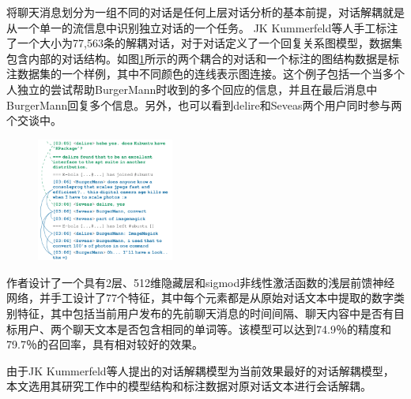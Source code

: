 将聊天消息划分为一组不同的对话是任何上层对话分析的基本前提，对话解耦就是从一个单一的流信息中识别独立对话的一个任务。
JK Kummerfeld等人\cite{kummerfeld2018large}手工标注了一个大小为77,563条的解耦对话，对于对话定义了一个回复关系图模型，数据集包含内部的对话结构。如图\ref{fig:example-conversation}所示的两个耦合的对话和一个标注的图结构数据是标注数据集的一个样例，其中不同颜色的连线表示图连接。这个例子包括一个当多个人独立的尝试帮助BurgerMann时收到的多个回应的信息，并且在最后消息中BurgerMann回复多个信息。另外，也可以看到delire和Seveas两个用户同时参与两个交谈中。
\begin{figure}[htb]
    \centering
    \includegraphics[width=0.4\textwidth]{Img/example-conversation.png}
    \label{fig:example-conversation}
\end{figure}
作者设计了一个具有2层、512维隐藏层和sigmod非线性激活函数的浅层前馈神经网络，并手工设计了77个特征，其中每个元素都是从原始对话文本中提取的数字类别特征，其中包括当前用户发布的先前聊天消息的时间间隔、聊天内容中是否有目标用户、两个聊天文本是否包含相同的单词等。该模型可以达到74.9％的精度和79.7％的召回率，具有相对较好的效果。

由于JK Kummerfeld等人提出的对话解耦模型为当前效果最好的对话解耦模型，本文选用其研究工作中的模型结构和标注数据对原对话文本进行会话解耦。

